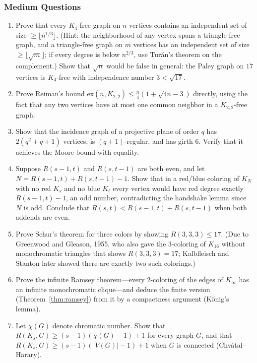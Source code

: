 \documentclass{article}
\theoremstyle{definition}
\begin{document}
\subsubsection{Medium Questions}
\begin{enumerate}[resume]
\item Prove that every $K_4$-free graph on $n$ vertices contains an
independent set of size $\ge \lfloor n^{1/3} \rfloor$. (Hint: the
neighborhood of any vertex spans a triangle-free graph, and a
triangle-free graph on $m$ vertices has an independent set of size
$\ge \lfloor \sqrt{m} \rfloor$; if every degree is below $n^{2/3}$, use
Tur\'an's theorem on the complement.) Show that $\sqrt{n}$ would be false
in general: the Paley graph on $17$ vertices is $K_4$-free with
independence number $3 < \sqrt{17}$.

\item Prove Reiman's bound
$\mathrm{ex}(n, K_{2, 2}) \le \tfrac{n}{4}(1 + \sqrt{4n - 3})$
directly, using the fact that any two vertices have at most one
common neighbor in a $K_{2, 2}$-free graph.

\item Show that the incidence graph of a projective plane of order $q$
has $2(q^2 + q + 1)$ vertices, is $(q + 1)$-regular, and has girth
$6$. Verify that it achieves the Moore bound with equality.

\item Suppose $R(s - 1, t)$ and $R(s, t - 1)$ are both even, and let
$N = R(s - 1, t) + R(s, t - 1) - 1$. Show that in a red/blue coloring of
$K_N$ with no red $K_s$ and no blue $K_t$ every vertex would have red
degree exactly $R(s - 1, t) - 1$, an odd number, contradicting the
handshake lemma since $N$ is odd. Conclude that
$R(s, t) < R(s - 1, t) + R(s, t - 1)$ when both addends are even.

\item Prove Schur's theorem for three colors by showing $R(3, 3, 3) \le 17$.
(Due to Greenwood and Gleason, 1955, who also gave the $3$-coloring of
$K_{16}$ without monochromatic triangles that shows $R(3, 3, 3) = 17$;
Kalbfleisch and Stanton later showed there are exactly two such colorings.)

\item Prove the infinite Ramsey theorem---every $2$-coloring of the edges
of $K_\infty$ has an infinite monochromatic clique---and deduce the
finite version (Theorem~\ref{thm:ramsey}) from it by a compactness
argument (K\H{o}nig's lemma).

\item Let $\chi(G)$ denote chromatic number. Show that
$R(K_s, G) \ge (s - 1)(\chi(G) - 1) + 1$ for every graph $G$, and that
$R(K_s, G) \ge (s - 1)(|V(G)| - 1) + 1$ when $G$ is connected
(Chv\'atal--Harary).


\end{enumerate}
\end{document}
